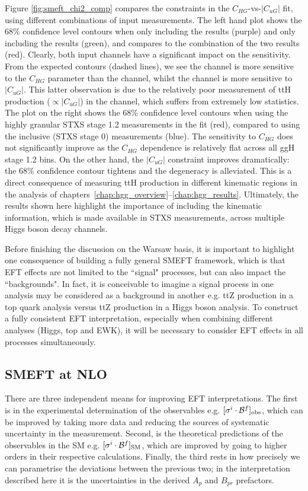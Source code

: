 Figure \ref{fig:smeft_chi2_comp} compares the constraints in the $C_{HG}$-vs-$|C_{uG}|$ fit, using different combinations of input measurements. The left hand plot shows the 68\% confidence level contours when only including the \Hgg results (purple) and only including the \Hfl results (green), and compares to the combination of the two results (red). Clearly, both input channels have a significant impact on the sensitivity. From the expected contours (dashed lines), we see the \Hfl channel is more sensitive to the $C_{HG}$ parameter than the \Hgg channel, whilst the \Hgg channel is more sensitive to $|C_{uG}|$. This latter observation is due to the relatively poor measurement of ttH production ($\propto|C_{uG}|$) in the \Hfl channel, which suffers from extremely low statistics. The plot on the right shows the 68\% confidence level contours when using the highly granular STXS stage 1.2 measurements in the fit (red), compared to using the inclusive (STXS stage 0) measurements (blue). The sensitivity to $C_{HG}$ does not significantly improve as the $C_{HG}$ dependence is relatively flat across all ggH stage 1.2 bins. On the other hand, the $|C_{uG}|$ constraint improves dramatically: the 68\% confidence contour tightens and the degeneracy is alleviated. This is a direct consequence of measuring ttH production in different kinematic regions in the \Hgg analysis of chapters~\ref{chap:hgg_overview}--\ref{chap:hgg_results}. Ultimately, the results shown here highlight the importance of including the kinematic information, which is made available in STXS measurements, across multiple Higgs boson decay channels.

Before finishing the discussion on the Warsaw basis, it is important to highlight one consequence of building a fully general SMEFT framework, which is that EFT effects are not limited to the ``signal" processes, but can also impact the ``backgrounds". In fact, it is conceivable to imagine a signal process in one analysis may be considered as a background in another e.g. ttZ production in a top quark analysis versus ttZ production in a Higgs boson analysis. To construct a fully consistent EFT interpretation, especially when combining different analyses (Higgs, top and EWK), it will be necessary to consider EFT effects in all processes simultaneously.


\subsection{SMEFT at NLO}
There are three independent means for improving EFT interpretations. The first is in the experimental determination of the observables e.g. $[\sigma^i\cdot\mathcal{B}^f]_{\rm{obs}}$, which can be improved by taking more data and reducing the sources of systematic uncertainty in the measurement. Second, is the theoretical predictions of the observables in the SM e.g. $[\sigma^i\cdot\mathcal{B}^f]_{\rm{SM}}$, which are improved by going to higher orders in their respective calculations. Finally, the third rests in how precisely we can parametrise the deviations between the previous two; in the interpretation described here it is the uncertainties in the derived $A_p$ and $B_{pr}$ prefactors.

